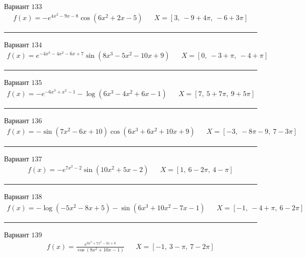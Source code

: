 \documentclass[11pt]{report}
\begin{document}
Вариант \(133\)
\begin{align*}
    f(x) = - e^{4 x^{2} - 9 x - 8} \cos{\left(6 x^{2} + 2 x - 5 \right)} && X = \left[ 3, \  -9 + 4 \pi, \  -6 + 3 \pi\right]
\end{align*}
\begin{center}
    \noindent\rule{8cm}{0.4pt}
\end{center}
Вариант \(134\)
\begin{align*}
    f(x) = e^{- 4 x^{3} - 4 x^{2} - 6 x + 7} \sin{\left(8 x^{3} - 5 x^{2} - 10 x + 9 \right)} && X = \left[ 0, \  -3 + \pi, \  -4 + \pi\right]
\end{align*}
\begin{center}
    \noindent\rule{8cm}{0.4pt}
\end{center}
Вариант \(135\)
\begin{align*}
    f(x) = - e^{- 6 x^{3} + x^{2} - 1} - \log{\left(6 x^{3} - 4 x^{2} + 6 x - 1 \right)} && X = \left[ 7, \  5 + 7 \pi, \  9 + 5 \pi\right]
\end{align*}
\begin{center}
    \noindent\rule{8cm}{0.4pt}
\end{center}
Вариант \(136\)
\begin{align*}
    f(x) = - \sin{\left(7 x^{2} - 6 x + 10 \right)} \cos{\left(6 x^{3} + 6 x^{2} + 10 x + 9 \right)} && X = \left[ -3, \  - 8 \pi - 9, \  7 - 3 \pi\right]
\end{align*}
\begin{center}
    \noindent\rule{8cm}{0.4pt}
\end{center}
Вариант \(137\)
\begin{align*}
    f(x) = - e^{7 x^{2} - 2} \sin{\left(10 x^{2} + 5 x - 2 \right)} && X = \left[ 1, \  6 - 2 \pi, \  4 - \pi\right]
\end{align*}
\begin{center}
    \noindent\rule{8cm}{0.4pt}
\end{center}
Вариант \(138\)
\begin{align*}
    f(x) = - \log{\left(- 5 x^{2} - 8 x + 5 \right)} - \sin{\left(6 x^{3} + 10 x^{2} - 7 x - 1 \right)} && X = \left[ -1, \  -4 + \pi, \  6 - 2 \pi\right]
\end{align*}
\begin{center}
    \noindent\rule{8cm}{0.4pt}
\end{center}
Вариант \(139\)
\begin{align*}
    f(x) = \frac{e^{9 x^{3} + 7 x^{2} - 3 x + 8}}{\cos{\left(8 x^{2} + 10 x - 1 \right)}} && X = \left[ -1, \  3 - \pi, \  7 - 2 \pi\right]
\end{align*}
\end{document}
